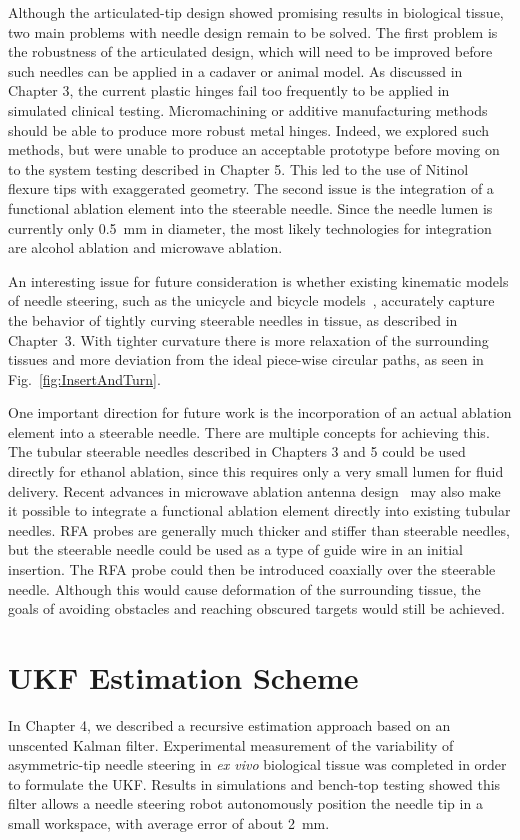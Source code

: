 Although the articulated-tip design showed promising results in biological tissue, two main problems with needle design remain to be solved. The first problem is the robustness of the articulated design, which will need to be improved before such needles can be applied in a cadaver or animal model. As discussed in Chapter 3, the current plastic hinges fail too frequently to be applied in simulated clinical testing. Micromachining or additive manufacturing methods should be able to produce more robust metal hinges. Indeed, we explored such methods, but were unable to produce an acceptable prototype before moving on to the system testing described in Chapter 5. This led to the use of Nitinol flexure tips with exaggerated geometry. The second issue is the integration of a functional ablation element into the steerable needle. Since the needle lumen is currently only 0.5~mm in diameter, the most likely technologies for integration are alcohol ablation and microwave ablation.

An interesting issue for future consideration is whether existing kinematic models of needle steering, such as the unicycle and bicycle models~\cite{Park2005,Webster2006}, accurately capture the behavior of tightly curving steerable needles in tissue, as described in Chapter~3. With tighter curvature there is more relaxation of the surrounding tissues and more deviation from the ideal piece-wise circular paths, as seen in Fig.~\ref{fig:InsertAndTurn}.

One important direction for future work is the incorporation of an actual ablation element into a steerable needle. There are multiple concepts for achieving this. The tubular steerable needles described in Chapters 3 and 5 could be used directly for ethanol ablation, since this requires only a very small lumen for fluid delivery. Recent advances in microwave ablation antenna design~\cite{Luyen2014,Luyen2015} may also make it possible to integrate a functional ablation element directly into existing tubular needles. RFA probes are generally much thicker and stiffer than steerable needles, but the steerable needle could be used as a type of guide wire in an initial insertion. The RFA probe could then be introduced coaxially over the steerable needle. Although this would cause deformation of the surrounding tissue, the goals of avoiding obstacles and reaching obscured targets would still be achieved.

\section{UKF Estimation Scheme}
In Chapter 4, we described a recursive estimation approach based on an unscented Kalman filter. Experimental measurement of the variability of asymmetric-tip needle steering in \textit{ex vivo} biological tissue was completed in order to formulate the UKF. Results in simulations and bench-top testing showed this filter allows a needle steering robot autonomously position the needle tip in a small workspace, with average error of about 2~mm.

